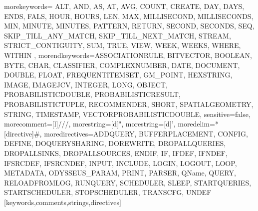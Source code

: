    {morekeywords={%
ALT, AND, AS, AT, AVG, COUNT, CREATE, DAY, DAYS, ENDS, FALS, HOUR, HOURS, LEN, MAX, MILLISECOND, MILLISECONDS, MIN, MINUTE, MINUTES, PATTERN, RETURN, SECOND, SECONDS, SEQ, SKIP_TILL_ANY_MATCH, SKIP_TILL_NEXT_MATCH, STREAM, STRICT_CONTIGUITY, SUM, TRUE, VIEW, WEEK, WEEKS, WHERE, WITHIN%
      },%
   morendkeywords={ASSOCIATIONRULE, BITVECTOR, BOOLEAN, BYTE, CHAR, CLASSIFIER, COMPLEXNUMBER, DATE, DOCUMENT, DOUBLE, FLOAT, FREQUENTITEMSET, GM_POINT, HEXSTRING, IMAGE, IMAGEJCV, INTEGER, LONG, OBJECT, PROBABILISTICDOUBLE, PROBABILISTICRESULT, PROBABILISTICTUPLE, RECOMMENDER, SHORT, SPATIALGEOMETRY, STRING, TIMESTAMP, VECTORPROBABILISTICDOUBLE},%
   sensitive=false,
   morecomment=[l]///,%
   morestring=[d]",%
   morestring=[d]',%
   moredelim=*[directive]\#,%
   moredirectives={ADDQUERY, BUFFERPLACEMENT, CONFIG, DEFINE, DOQUERYSHARING, DOREWRITE, DROPALLQUERIES, DROPALLSINKS, DROPALLSOURCES, ENDIF, IF, IFDEF, IFNDEF, IFSRCDEF, IFSRCNDEF, INPUT, INCLUDE, LOGIN, LOGOUT, LOOP, METADATA, ODYSSEUS_PARAM, PRINT, PARSER, QName, QUERY, RELOADFROMLOG, RUNQUERY, SCHEDULER, SLEEP, STARTQUERIES, STARTSCHEDULER, STOPSCHEDULER, TRANSCFG, UNDEF}%
}[keywords,comments,strings,directives]

